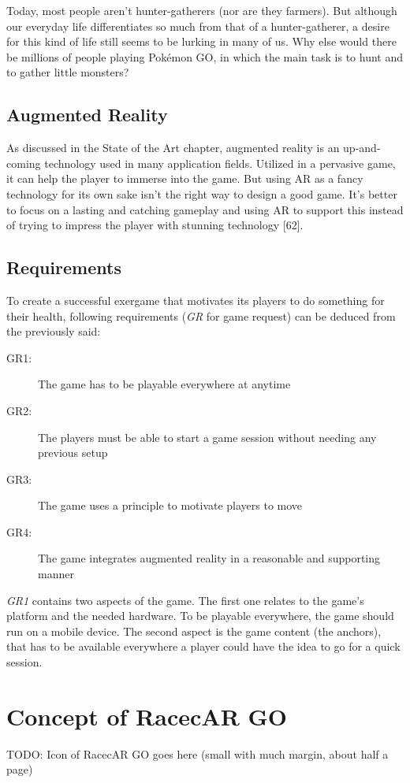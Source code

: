 Today, most people aren’t hunter-gatherers (nor are they farmers). But although our everyday life differentiates so much from that of a hunter-gatherer, a desire for this kind of life still seems to be lurking in many of us. Why else would there be millions of people playing Pokémon GO, in which the main task is to hunt and to gather little monsters?

\subsection{Augmented Reality}
As discussed in the State of the Art chapter, augmented reality is an up-and-coming technology used in many application fields. Utilized in a pervasive game, it can help the player to immerse into the game. But using AR as a fancy technology for its own sake isn’t the right way to design a good game. It’s better to focus on a lasting and catching gameplay and using AR to support this instead of trying to impress the player with stunning technology [62].

\subsection{Requirements}
To create a successful exergame that motivates its players to do something for their health, following requirements (\emph{GR} for game request) can be deduced from the previously said:
\begin{description}
  \item[GR1:] The game has to be playable everywhere at anytime
  \item[GR2:] The players must be able to start a game session without needing any previous setup
  \item[GR3:] The game uses a principle to motivate players to move
  \item[GR4:] The game integrates augmented reality in a reasonable and supporting manner
\end{description}
\emph{GR1} contains two aspects of the game. The first one relates to the game’s platform and the needed hardware. To be playable everywhere, the game should run on a mobile device. The second aspect is the game content (the anchors), that has to be available everywhere a player could have the idea to go for a quick session.


\section{Concept of RacecAR GO}
TODO: Icon of RacecAR GO goes here (small with much margin, about half a page)

